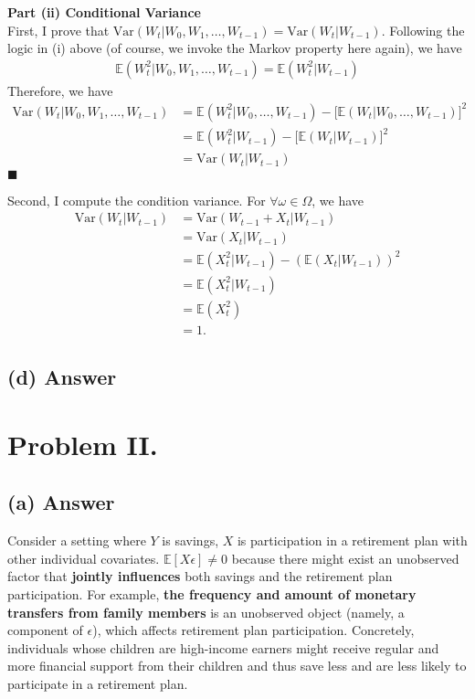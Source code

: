 \documentclass[11pt]{article}
\theoremstyle{definition}
\theoremstyle{boldtitle} %
\numberwithin{equation}{section}
\numberwithin{figure}{section}
\numberwithin{table}{section}
\begin{document}
\vspace{5mm}
\noindent \textbf{Part (ii) Conditional Variance} 
\\
\noindent First, I prove that $\text{Var}(W_t | W_0, W_1, \dots, W_{t-1}) = \text{Var}(W_t | W_{t-1})$.
Following the logic in (i) above (of course, we invoke the Markov property here again), we have 
\begin{align}
\mathbb{E}(W_t^2 | W_0, W_1, \dots, W_{t-1}) = \mathbb{E}(W_t^2 | W_{t-1})
\end{align}
Therefore, we have 
\begin{align*}
\text{Var}(W_t | W_0, W_1, \dots, W_{t-1}) & = \mathbb{E}(W_t^2 | W_0, \dots, W_{t-1}) - \bigg[\mathbb{E}(W_t | W_0, \dots, W_{t-1})\bigg]^2 \\ 
& = \mathbb{E}(W_t^2 | W_{t-1}) - \bigg[\mathbb{E}(W_t | W_{t-1})\bigg]^2 \\
& = \text{Var}(W_t | W_{t-1})
\end{align*}
\(\blacksquare\)



\noindent Second, I compute the condition variance. For $\forall \omega \in \Omega$, we have
\begin{align*}
\text{Var}(W_t | W_{t-1}) & = \text{Var}(W_{t-1} + X_t | W_{t-1}) \\ 
& = \text{Var}(X_t | W_{t-1}) \\
& = \mathbb{E}(X_t^2 | W_{t-1}) - (\mathbb{E}(X_t | W_{t-1}))^2 \\  
& = \mathbb{E}(X_t^2 | W_{t-1}) \\ 
& = \mathbb{E}(X_t^2) \\ 
& = 1.
\end{align*}


\subsection{(d) Answer}

\section*{Problem II.}
\subsection{(a) Answer}
Consider a setting where $Y$ is savings, $X$ is participation in a retirement plan with 
other individual covariates.
$\mathbb{E}[X\epsilon] \neq 0$ because there might exist an unobserved factor that \textbf{jointly influences}
both savings and the retirement plan participation.
For example, \textbf{the frequency and amount of monetary transfers from family members} is an unobserved object 
(namely, a component of $\epsilon$), which affects retirement plan participation.
Concretely, individuals whose children are high-income earners might 
receive regular and more financial support from their children and thus save less and are less likely to participate in a retirement plan.
\end{document}
